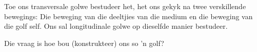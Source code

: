 \label{m38782*id292159}
  Toe ons transversale golwe bestudeer het, het ons gekyk na twee verskillende bewegings: Die beweging van die deeltjies van die medium en die beweging van die golf self. Ons sal longitudinale golwe op dieselfde manier bestudeer.\par 
      \label{m38782*id292164}Die vraag is hoe bou (konstrukteer) ons so 'n golf?\par 

